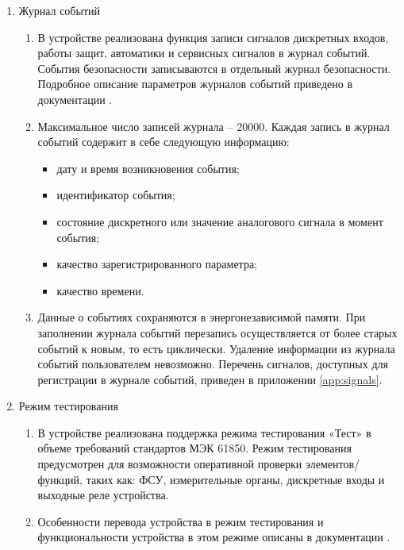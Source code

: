\begin{enumerate}
\item Журнал событий
\begin{enumerate}
\item В устройстве реализована функция записи сигналов дискретных входов, работы защит, автоматики и сервисных сигналов в журнал событий.
События безопасности записываются в отдельный журнал безопасности.
Подробное описание параметров журналов событий приведено в документации \ManualUnitGeneral.
\item Максимальное число записей журнала -- 20000.
Каждая запись в журнал событий содержит в себе следующую информацию:
\begin{itemize}
\item дату и время возникновения события;
\item идентификатор события;
\item состояние дискретного или значение аналогового сигнала в момент события;
\item качество зарегистрированного параметра;
\item качество времени.
\end{itemize}
\item Данные о событиях сохраняются в энергонезависимой памяти.
При заполнении журнала событий перезапись осуществляется от более старых событий к новым, то есть циклически.
Удаление информации из журнала событий пользователем невозможно.
Перечень сигналов, доступных для регистрации в журнале событий, приведен в приложении \ref{app:signals}.
\end{enumerate}

\item Режим тестирования
\begin{enumerate}
\item В устройстве реализована поддержка режима тестирования «Тест» в объеме требований стандартов МЭК 61850.
Режим тестирования предусмотрен для возможности оперативной проверки элементов/функций, таких как: ФСУ, измерительные органы, дискретные входы и выходные реле устройства.
\item Особенности перевода устройства в режим тестирования и функциональности устройства в этом режиме описаны в документации \ManualUnitGeneral.
\end{enumerate}


\end{enumerate}
